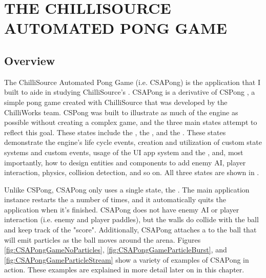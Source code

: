 
\chapter{THE CHILLISOURCE AUTOMATED PONG GAME}\label{ch:csapong_game}

\section{Overview}\label{sec:game_overview}

The ChilliSource Automated Pong Game \cite{CSAPongGame2016} (i.e. CSAPong) is the application that I built to aide in studying ChilliSource's . CSAPong is a derivative of CSPong \cite{ChilliSourceSample2016Repository}, a simple pong game created with ChilliSource that was developed by the ChilliWorks team. CSPong was built to illustrate as much of the engine as possible without creating a complex game, and the three main states attempt to reflect this goal. These states include the , the , and the . These states demonstrate the engine's life cycle events, creation and utilization of custom state systems and custom events, usage of the UI app system and the , and, most importantly, how to design entities and components to add enemy AI, player interaction, physics, collision detection, and so on. All three states are shown in .

Unlike CSPong, CSAPong only uses a single state, the . The main application instance restarts the  a number of times, and it automatically quits the application when it's finished. CSAPong does not have enemy AI or player interaction (i.e. enemy and player paddles), but the walls do collide with the ball and keep track of the "score". Additionally, CSAPong attaches a  to the ball that will emit particles as the ball moves around the arena. Figures \ref{fig:CSAPongGameNoParticles}, \ref{fig:CSAPongGameParticleBurst}, and \ref{fig:CSAPongGameParticleStream} show a variety of examples of CSAPong in action. These examples are explained in more detail later on in this chapter.



